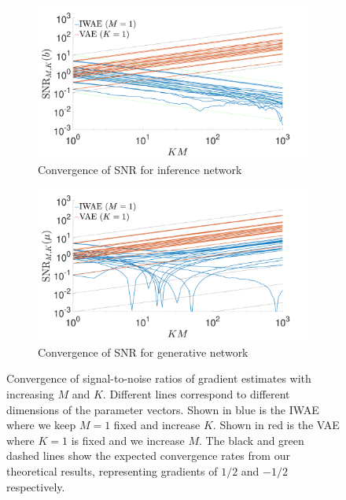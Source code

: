 \begin{figure}[t]
	\centering
	\begin{subfigure}[b]{0.4\textwidth}
		\centering
		\includegraphics[width=\textwidth]{figures/tighter_bounds/b_conv}
		\caption{Convergence of \gls{SNR} for inference network \label{fig:snr/b}}
	\end{subfigure}
	\begin{subfigure}[b]{0.4\textwidth}
		\centering
		\includegraphics[width=\textwidth]{figures/tighter_bounds/mu_conv}
		\caption{Convergence of \gls{SNR} for generative network\label{fig:snr/mu}}
	\end{subfigure}
	\caption{Convergence of signal-to-noise ratios of gradient estimates with increasing $M$ and $K$.
		Different lines correspond to different
		dimensions of the parameter vectors.
		Shown in blue is the \gls{IWAE} where we keep $M=1$ fixed and increase $K$.  
		Shown in red is the \gls{VAE} where $K=1$ is fixed and we increase $M$. 
		The black and green dashed lines show the expected convergence rates from our theoretical results, 
		representing gradients of $1/2$ and $-1/2$ respectively.  
		\label{fig:snr/K_conv}}
\end{figure}

